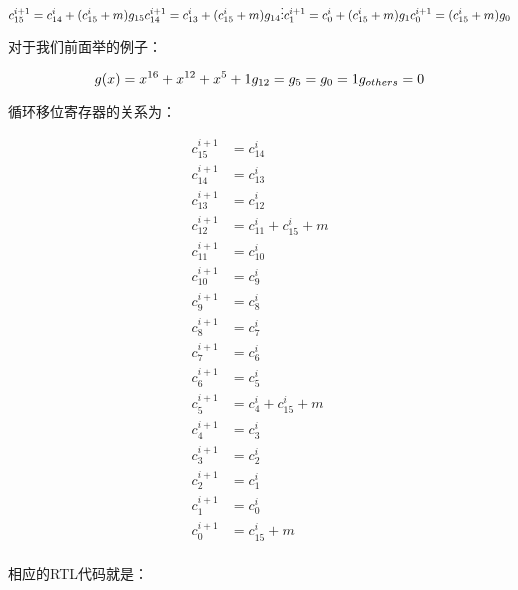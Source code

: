 \documentclass[
]{article}
\begin{document}
$$c_{15}^{i+1}=c_{14}^{i}+(c_{15}^i+m)g_{15}\\
c_{14}^{i+1}=c_{13}^{i}+(c_{15}^i+m)g_{14}\\
\vdots\\
c_{1}^{i+1}=c_{0}^{i}+(c_{15}^i+m)g_{1}\\
c_{0}^{i+1}=(c_{15}^i+m)g_{0}\\$$

对于我们前面举的例子：

$$g(x)=x^{16}+x^{12}+x^5+1\\
g_{12}=g_{5}=g_{0}=1\\
g_{others}=0$$

循环移位寄存器的关系为：

\begin{align}
c_{15}^{i+1}&=c_{14}^{i}\\
c_{14}^{i+1}&=c_{13}^{i}\\
c_{13}^{i+1}&=c_{12}^{i}\\
c_{12}^{i+1}&=c_{11}^{i}+c_{15}^i+m\\
c_{11}^{i+1}&=c_{10}^{i}\\
c_{10}^{i+1}&=c_{ 9}^{i}\\
c_{ 9}^{i+1}&=c_{ 8}^{i}\\
c_{ 8}^{i+1}&=c_{ 7}^{i}\\
c_{ 7}^{i+1}&=c_{ 6}^{i}\\
c_{ 6}^{i+1}&=c_{ 5}^{i}\\
c_{ 5}^{i+1}&=c_{ 4}^{i}+c_{15}^i+m\\
c_{ 4}^{i+1}&=c_{ 3}^{i}\\
c_{ 3}^{i+1}&=c_{ 2}^{i}\\
c_{ 2}^{i+1}&=c_{ 1}^{i}\\
c_{ 1}^{i+1}&=c_{ 0}^{i}\\
c_{ 0}^{i+1}&=c_{15}^i+m\\
\end{align}

相应的RTL代码就是：
\end{document}
